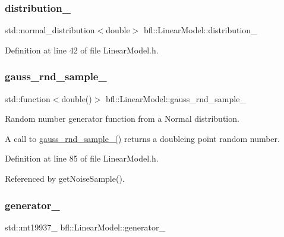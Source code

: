 \subsubsection{\texorpdfstring{distribution\+\_\+}{distribution\_}}
{\footnotesize\ttfamily std\+::normal\+\_\+distribution$<$double$>$ bfl\+::\+Linear\+Model\+::distribution\+\_\+\hspace{0.3cm}{\ttfamily [private]}}



Definition at line 42 of file Linear\+Model.\+h.

\mbox{\label{classbfl_1_1LinearModel_aa58a166ce01d56574fe0b3f4d41dea19}} 
\subsubsection{\texorpdfstring{gauss\+\_\+rnd\+\_\+sample\+\_\+}{gauss\_rnd\_sample\_}}
{\footnotesize\ttfamily std\+::function$<$double()$>$ bfl\+::\+Linear\+Model\+::gauss\+\_\+rnd\+\_\+sample\+\_\+\hspace{0.3cm}{\ttfamily [protected]}}



Random number generator function from a Normal distribution. 

A call to {\ttfamily \mbox{\hyperlink{classbfl_1_1LinearModel_aa58a166ce01d56574fe0b3f4d41dea19}{gauss\+\_\+rnd\+\_\+sample\+\_\+()}}} returns a doubleing point random number. 

Definition at line 85 of file Linear\+Model.\+h.



Referenced by get\+Noise\+Sample().

\mbox{\label{classbfl_1_1LinearModel_a6d2f72dd7215d227656292f00d060cfc}} 
\subsubsection{\texorpdfstring{generator\+\_\+}{generator\_}}
{\footnotesize\ttfamily std\+::mt19937\+\_ bfl\+::\+Linear\+Model\+::generator\+\_\+\hspace{0.3cm}{\ttfamily [private]}}



